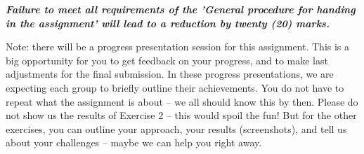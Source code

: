 \documentclass{pracs}
\begin{document}
\textbf{\emph{Failure to meet all requirements of the 'General procedure for handing in the assignment' will lead to a reduction by twenty (20) marks.}}

Note: there will be a progress presentation session for this assignment. This is a big opportunity for you to get feedback on your progress, and to make last adjustments for the final submission. 
In these progress presentations, we are expecting each group to briefly outline their achievements. You do not have to repeat what the assignment is about -- we all should know this by then. Please do not show us the results of Exercise 2 -- this would spoil the fun! But for the other exercises, you can outline your approach, your results (screenshots), and tell us about your challenges -- maybe we can help you right away.
\end{document}

